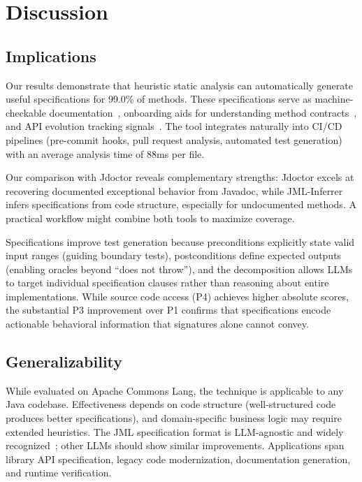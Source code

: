 \section{Discussion}
\label{sec:discussion}

\subsection{Implications}

Our results demonstrate that heuristic static analysis can automatically generate useful specifications for 99.0\% of methods. These specifications serve as machine-checkable documentation~\cite{peters1998using}, onboarding aids for understanding method contracts~\cite{sillito2008questions}, and API evolution tracking signals~\cite{tip2002practical}. The tool integrates naturally into CI/CD pipelines (pre-commit hooks, pull request analysis, automated test generation) with an average analysis time of 88ms per file.

Our comparison with Jdoctor reveals complementary strengths: Jdoctor excels at recovering documented exceptional behavior from Javadoc, while JML-Inferrer infers specifications from code structure, especially for undocumented methods. A practical workflow might combine both tools to maximize coverage.

Specifications improve test generation because preconditions explicitly state valid input ranges (guiding boundary tests), postconditions define expected outputs (enabling oracles beyond ``does not throw''), and the decomposition allows LLMs to target individual specification clauses rather than reasoning about entire implementations. While source code access (P4) achieves higher absolute scores, the substantial P3 improvement over P1 confirms that specifications encode actionable behavioral information that signatures alone cannot convey.

\subsection{Generalizability}

While evaluated on Apache Commons Lang, the technique is applicable to any Java codebase. Effectiveness depends on code structure (well-structured code produces better specifications), and domain-specific business logic may require extended heuristics. The JML specification format is LLM-agnostic and widely recognized~\cite{leavens2006design}; other LLMs should show similar improvements. Applications span library API specification, legacy code modernization, documentation generation, and runtime verification.

